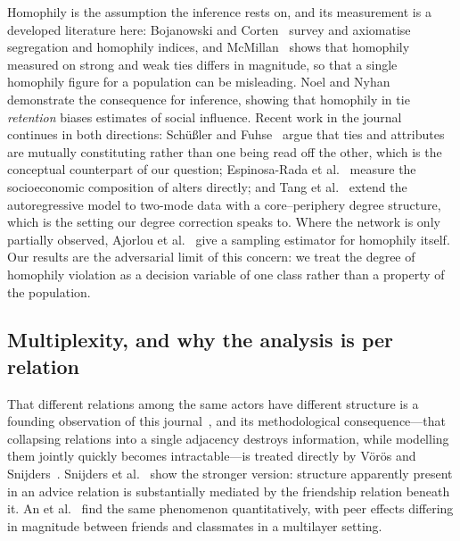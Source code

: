 \documentclass[../elsevier.tex]{subfiles}
\begin{document}
Homophily is the assumption the inference rests on, and its measurement is a
developed literature here: Bojanowski and Corten~\citeyearpar{bojanowski2014measuring}
survey and axiomatise segregation and homophily indices, and
McMillan~\citeyearpar{mcmillan2022worth} shows that homophily measured on strong and weak
ties differs in magnitude, so that a single homophily figure for a population can be
misleading. Noel and Nyhan~\citeyearpar{noel2011unfriending} demonstrate the consequence for
inference, showing that homophily in tie \emph{retention} biases estimates of social
influence. Recent work in the journal continues in both directions: Sch\"u{\ss}ler and
Fuhse~\citeyearpar{schussler2025duality} argue that ties and attributes are mutually
constituting rather than one being read off the other, which is the conceptual
counterpart of our question; Espinosa-Rada et al.~\citeyearpar{espinosarada2026socioeconomic}
measure the socioeconomic composition of alters directly; and Tang et
al.~\citeyearpar{tang2026twomode} extend the autoregressive model to two-mode data with a
core--periphery degree structure, which is the setting our degree correction speaks to.
Where the network is only partially observed, Ajorlou et
al.~\citeyearpar{ajorlou2025dirichlet} give a sampling estimator for homophily itself.
Our results are the adversarial limit of this concern: we treat the degree
of homophily violation as a decision variable of one class rather than a property of
the population.

\subsection{Multiplexity, and why the analysis is per relation}
\label{sec:related-multiplex}

That different relations among the same actors have different structure is a founding
observation of this journal~\citep{lazega1999multiplexity}, and its methodological
consequence---that collapsing relations into a single adjacency destroys information,
while modelling them jointly quickly becomes intractable---is treated directly by
V\"or\"os and Snijders~\citeyearpar{voros2017cluster}. Snijders et
al.~\citeyearpar{snijders2013model} show the stronger version: structure apparently present
in an advice relation is substantially mediated by the friendship relation beneath
it. An et al.~\citeyearpar{an2026estimating} find the same phenomenon quantitatively, with
peer effects differing in magnitude between friends and classmates in a multilayer
setting.
\end{document}
